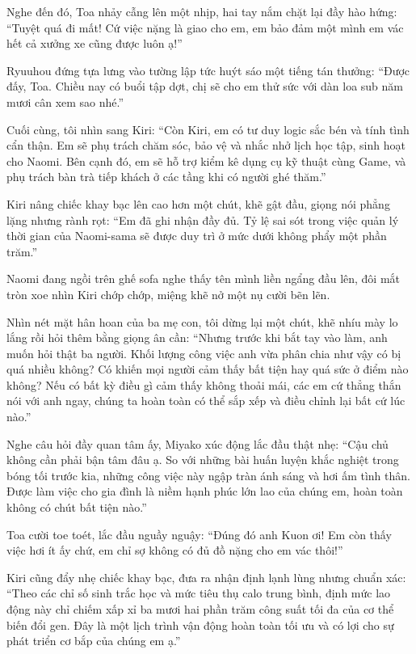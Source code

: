 \documentclass[../main.tex]{subfiles}
\begin{document}
Nghe đến đó, Toa nhảy cẫng lên một nhịp, hai tay nắm chặt lại đầy hào hứng: ``Tuyệt quá đi mất! Cứ việc nặng là giao cho em, em bảo đảm một mình em vác hết cả xưởng xe cũng được luôn ạ!''

Ryuuhou đứng tựa lưng vào tường lập tức huýt sáo một tiếng tán thưởng: ``Được đấy, Toa. Chiều nay có buổi tập dợt, chị sẽ cho em thử sức với dàn loa sub năm mươi cân xem sao nhé.''

Cuối cùng, tôi nhìn sang Kiri: ``Còn Kiri, em có tư duy logic sắc bén và tính tình cẩn thận. Em sẽ phụ trách chăm sóc, bảo vệ và nhắc nhở lịch học tập, sinh hoạt cho Naomi. Bên cạnh đó, em sẽ hỗ trợ kiểm kê dụng cụ kỹ thuật cùng Game, và phụ trách bàn trà tiếp khách ở các tầng khi có người ghé thăm.''

Kiri nâng chiếc khay bạc lên cao hơn một chút, khẽ gật đầu, giọng nói phẳng lặng nhưng rành rọt: ``Em đã ghi nhận đầy đủ. Tỷ lệ sai sót trong việc quản lý thời gian của Naomi-sama sẽ được duy trì ở mức dưới không phẩy một phần trăm.''

Naomi đang ngồi trên ghế sofa nghe thấy tên mình liền ngẩng đầu lên, đôi mắt tròn xoe nhìn Kiri chớp chớp, miệng khẽ nở một nụ cười bẽn lẽn.

Nhìn nét mặt hân hoan của ba mẹ con, tôi dừng lại một chút, khẽ nhíu mày lo lắng rồi hỏi thêm bằng giọng ân cần: ``Nhưng trước khi bắt tay vào làm, anh muốn hỏi thật ba người. Khối lượng công việc anh vừa phân chia như vậy có bị quá nhiều không? Có khiến mọi người cảm thấy bất tiện hay quá sức ở điểm nào không? Nếu có bất kỳ điều gì cảm thấy không thoải mái, các em cứ thẳng thắn nói với anh ngay, chúng ta hoàn toàn có thể sắp xếp và điều chỉnh lại bất cứ lúc nào.''

Nghe câu hỏi đầy quan tâm ấy, Miyako xúc động lắc đầu thật nhẹ: ``Cậu chủ không cần phải bận tâm đâu ạ. So với những bài huấn luyện khắc nghiệt trong bóng tối trước kia, những công việc này ngập tràn ánh sáng và hơi ấm tình thân. Được làm việc cho gia đình là niềm hạnh phúc lớn lao của chúng em, hoàn toàn không có chút bất tiện nào.''

Toa cười toe toét, lắc đầu nguầy nguậy: ``Đúng đó anh Kuon ơi! Em còn thấy việc hơi ít ấy chứ, em chỉ sợ không có đủ đồ nặng cho em vác thôi!''

Kiri cũng đẩy nhẹ chiếc khay bạc, đưa ra nhận định lạnh lùng nhưng chuẩn xác: ``Theo các chỉ số sinh trắc học và mức tiêu thụ calo trung bình, định mức lao động này chỉ chiếm xấp xỉ ba mươi hai phần trăm công suất tối đa của cơ thể biến đổi gen. Đây là một lịch trình vận động hoàn toàn tối ưu và có lợi cho sự phát triển cơ bắp của chúng em ạ.''
\end{document}
